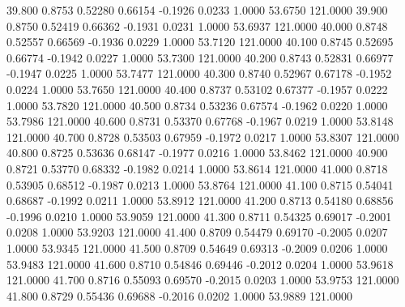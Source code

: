   39.800   0.8753   0.52280   0.66154  -0.1926   0.0233   1.0000  53.6750 121.0000
  39.900   0.8750   0.52419   0.66362  -0.1931   0.0231   1.0000  53.6937 121.0000
  40.000   0.8748   0.52557   0.66569  -0.1936   0.0229   1.0000  53.7120 121.0000
  40.100   0.8745   0.52695   0.66774  -0.1942   0.0227   1.0000  53.7300 121.0000
  40.200   0.8743   0.52831   0.66977  -0.1947   0.0225   1.0000  53.7477 121.0000
  40.300   0.8740   0.52967   0.67178  -0.1952   0.0224   1.0000  53.7650 121.0000
  40.400   0.8737   0.53102   0.67377  -0.1957   0.0222   1.0000  53.7820 121.0000
  40.500   0.8734   0.53236   0.67574  -0.1962   0.0220   1.0000  53.7986 121.0000
  40.600   0.8731   0.53370   0.67768  -0.1967   0.0219   1.0000  53.8148 121.0000
  40.700   0.8728   0.53503   0.67959  -0.1972   0.0217   1.0000  53.8307 121.0000
  40.800   0.8725   0.53636   0.68147  -0.1977   0.0216   1.0000  53.8462 121.0000
  40.900   0.8721   0.53770   0.68332  -0.1982   0.0214   1.0000  53.8614 121.0000
  41.000   0.8718   0.53905   0.68512  -0.1987   0.0213   1.0000  53.8764 121.0000
  41.100   0.8715   0.54041   0.68687  -0.1992   0.0211   1.0000  53.8912 121.0000
  41.200   0.8713   0.54180   0.68856  -0.1996   0.0210   1.0000  53.9059 121.0000
  41.300   0.8711   0.54325   0.69017  -0.2001   0.0208   1.0000  53.9203 121.0000
  41.400   0.8709   0.54479   0.69170  -0.2005   0.0207   1.0000  53.9345 121.0000
  41.500   0.8709   0.54649   0.69313  -0.2009   0.0206   1.0000  53.9483 121.0000
  41.600   0.8710   0.54846   0.69446  -0.2012   0.0204   1.0000  53.9618 121.0000
  41.700   0.8716   0.55093   0.69570  -0.2015   0.0203   1.0000  53.9753 121.0000
  41.800   0.8729   0.55436   0.69688  -0.2016   0.0202   1.0000  53.9889 121.0000
